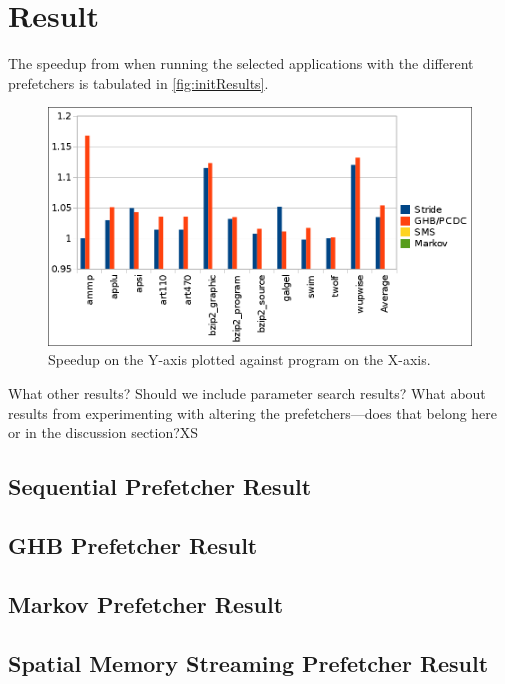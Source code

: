 
\section{Result}
\label{sec:result}

The speedup from when running the selected applications with the
different prefetchers is tabulated in \autoref{fig:initResults}.

\begin{figure}[ht]
  \centering
  \includegraphics[scale=0.25]{figures/init_results.png}
  \caption{\label{fig:initResults} Speedup on the Y-axis plotted
    against program on the X-axis.}
\end{figure}

What other results? Should we include parameter search results? What
about results from experimenting with altering the prefetchers---does
that belong here or in the discussion section?XS

\subsection{Sequential Prefetcher Result}
\label{sec:sequentialPrefetcherResult}

\subsection{GHB Prefetcher Result}
\label{sec:ghbPrefetcherResult}

\subsection{Markov Prefetcher Result}
\label{sec:markovPrefetcherResult}

\subsection{Spatial Memory Streaming Prefetcher Result}
\label{sec:smsPrefetcherResult}

